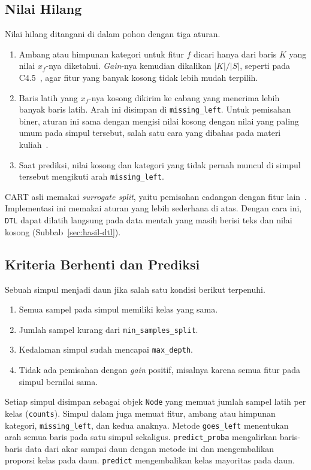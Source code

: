 \subsection{Nilai Hilang}

Nilai hilang ditangani di dalam pohon dengan tiga aturan.
\begin{enumerate}
	\item Ambang atau himpunan kategori untuk fitur $f$ dicari hanya dari baris
	$K$ yang nilai $x_f$-nya diketahui. \textit{Gain}-nya kemudian dikalikan
	$|K|/|S|$, seperti pada C4.5~\cite{quinlan1993c45}, agar fitur yang banyak
	kosong tidak lebih mudah terpilih.
	\item Baris latih yang $x_f$-nya kosong dikirim ke cabang yang menerima lebih
	banyak baris latih. Arah ini disimpan di \texttt{missing\_left}. Untuk
	pemisahan biner, aturan ini sama dengan mengisi nilai kosong dengan nilai
	yang paling umum pada simpul tersebut, salah satu cara yang dibahas pada
	materi kuliah~\cite{kkif2021dtlmissing}.
	\item Saat prediksi, nilai kosong dan kategori yang tidak pernah muncul di
	simpul tersebut mengikuti arah \texttt{missing\_left}.
\end{enumerate}
CART asli memakai \textit{surrogate split}, yaitu pemisahan cadangan dengan fitur
lain~\cite{breiman1984cart}. Implementasi ini memakai aturan yang lebih
sederhana di atas. Dengan cara ini, \texttt{DTL} dapat dilatih langsung pada data
mentah yang masih berisi teks dan nilai kosong (Subbab~\ref{sec:hasil-dtl}).

\subsection{Kriteria Berhenti dan Prediksi}

Sebuah simpul menjadi daun jika salah satu kondisi berikut terpenuhi.
\begin{enumerate}
	\item Semua sampel pada simpul memiliki kelas yang sama.
	\item Jumlah sampel kurang dari \texttt{min\_samples\_split}.
	\item Kedalaman simpul sudah mencapai \texttt{max\_depth}.
	\item Tidak ada pemisahan dengan \textit{gain} positif, misalnya karena semua
	fitur pada simpul bernilai sama.
\end{enumerate}
Setiap simpul disimpan sebagai objek \texttt{Node} yang memuat jumlah sampel
latih per kelas (\texttt{counts}). Simpul dalam juga memuat fitur, ambang atau
himpunan kategori, \texttt{missing\_left}, dan kedua anaknya. Metode
\texttt{goes\_left} menentukan arah semua baris pada satu simpul sekaligus.
\texttt{predict\_proba} mengalirkan baris-baris data dari akar sampai daun dengan
metode ini dan mengembalikan proporsi kelas pada daun. \texttt{predict}
mengembalikan kelas mayoritas pada daun.

